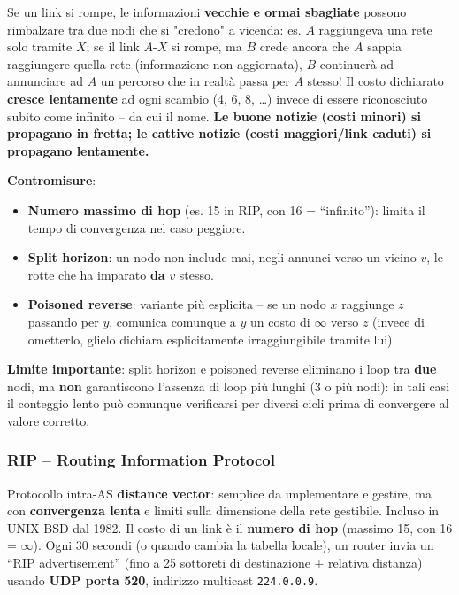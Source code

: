\documentclass[12pt, a4paper]{article}
\begin{document}
\begin{tcolorbox}[colback=red!5, colframe=red!60!black, title=\textbf{Il problema del ``count-to-infinity''}]
Se un link si rompe, le informazioni \textbf{vecchie e ormai sbagliate} possono rimbalzare tra due nodi che si "credono" a vicenda: es. $A$ raggiungeva una rete solo tramite $X$; se il link $A$-$X$ si rompe, ma $B$ crede ancora che $A$ sappia raggiungere quella rete (informazione non aggiornata), $B$ continuerà ad annunciare ad $A$ un percorso che in realtà passa per $A$ stesso! Il costo dichiarato \textbf{cresce lentamente} ad ogni scambio (4, 6, 8, \dots) invece di essere riconosciuto subito come infinito -- da cui il nome. \textbf{Le buone notizie (costi minori) si propagano in fretta; le cattive notizie (costi maggiori/link caduti) si propagano lentamente.}

\textbf{Contromisure}:
\begin{itemize}
    \item \textbf{Numero massimo di hop} (es. 15 in RIP, con 16 = ``infinito''): limita il tempo di convergenza nel caso peggiore.
    \item \textbf{Split horizon}: un nodo non include mai, negli annunci verso un vicino $v$, le rotte che ha imparato \textbf{da} $v$ stesso.
    \item \textbf{Poisoned reverse}: variante più esplicita -- se un nodo $x$ raggiunge $z$ passando per $y$, comunica comunque a $y$ un costo di $\infty$ verso $z$ (invece di ometterlo, glielo dichiara esplicitamente irraggiungibile tramite lui).
\end{itemize}
\textbf{Limite importante}: split horizon e poisoned reverse eliminano i loop tra \textbf{due} nodi, ma \textbf{non} garantiscono l'assenza di loop più lunghi (3 o più nodi): in tali casi il conteggio lento può comunque verificarsi per diversi cicli prima di convergere al valore corretto.
\end{tcolorbox}

\subsubsection{RIP -- Routing Information Protocol}

Protocollo intra-AS \textbf{distance vector}: semplice da implementare e gestire, ma con \textbf{convergenza lenta} e limiti sulla dimensione della rete gestibile. Incluso in UNIX BSD dal 1982. Il costo di un link è il \textbf{numero di hop} (massimo 15, con 16 = $\infty$). Ogni 30 secondi (o quando cambia la tabella locale), un router invia un ``RIP advertisement'' (fino a 25 sottoreti di destinazione + relativa distanza) usando \textbf{UDP porta 520}, indirizzo multicast \texttt{224.0.0.9}.
\end{document}
